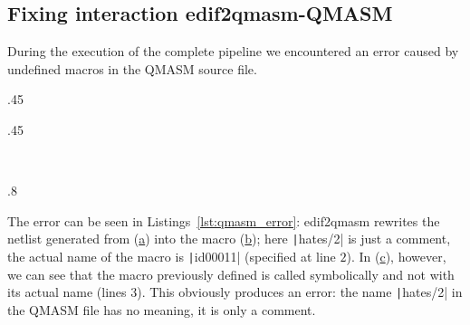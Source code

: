 {\subsection{Fixing interaction edif2qmasm-QMASM}
During the execution of the complete pipeline we encountered an error caused by undefined macros in the QMASM source file.

\begin{listingenv}[h]
	\centering
	\begin{sublisting}[c]{.45\linewidth}
		\caption{Verilog Code}
		\label{lst:error_verilog}
	\end{sublisting}
	\qquad
	\begin{sublisting}[c]{.45\linewidth}
		\caption{Macro definitions}
		\label{lst:error_def}
	\end{sublisting}
	\\\vspace{.5cm}
	\begin{sublisting}[c]{.8\linewidth}
		\caption{Macro usage}
		\label{lst:error_use}
	\end{sublisting}
	\caption{Undefined macros error}
	\label{lst:qmasm_error}
\end{listingenv}

The error can be seen in Listings~\ref{lst:qmasm_error}: edif2qmasm rewrites the netlist generated from (\hyperref[lst:error_verilog]{a}) into the macro (\hyperref[lst:error_def]{b}); here \texttt|hates/2| is just a comment, the actual name of the macro is \texttt|id00011| (specified at line $2$). In (\hyperref[lst:error_use]{c}), however, we can see that the macro previously defined is called symbolically and not with its actual name (lines $3$). This obviously produces an error: the name \texttt|hates/2| in the QMASM file has no meaning, it is only a comment.

}
